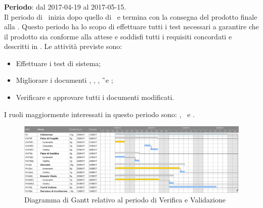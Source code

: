 		\subsubsection{\VV}
		\textbf{Periodo}: dal 2017-04-19 al 2017-05-15.\\
		Il periodo di \VV\ inizia dopo quello di \CO\ e termina con la consegna del prodotto finale alla \RA. Questo periodo ha lo scopo di effettuare tutti i test necessari a garantire che il prodotto sia conforme alla attese e soddisfi tutti i requisiti concordati e descritti in \AdR. Le attività previste sono:
		\begin{itemize}
			\item Effettuare i test di sistema;
			\item Migliorare i documenti \NdP, \PdP, \PdQ, \G\ e \MU;
			\item Verificare e approvare tutti i documenti modificati.
		\end{itemize}
			I ruoli maggiormente interessati in questo periodo sono: \textit{\Res}, \textit{\Prog}\ e \textit{\Ver}.
			
		\begin{figure}[ht]
			\centering
			\includegraphics[scale=0.34]{img/ganttnetbreak6.png}
			\caption{Diagramma di Gantt relativo al periodo di Verifica e Validazione}
		\end{figure}
		\FloatBarrier
